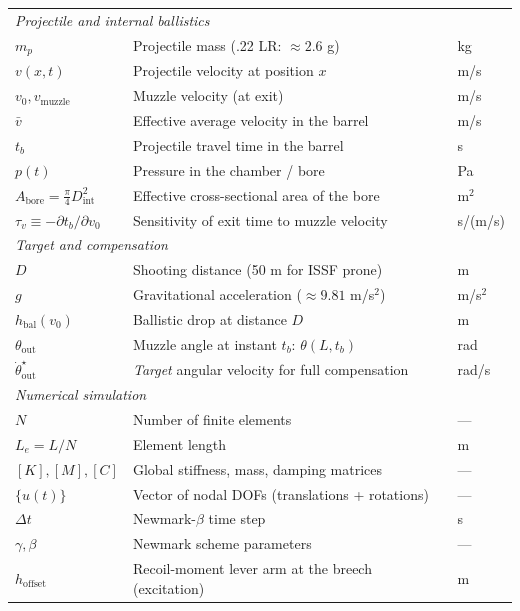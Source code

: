 \documentclass[12pt,a4paper]{article}
\begin{document}
\begin{center}
\begin{tabular}{l l l}
			\midrule
			\multicolumn{3}{l}{\emph{Projectile and internal ballistics}} \\
			$m_p$ & Projectile mass (.22 LR: $\approx 2.6$ g) & kg \\
			$v(x,t)$ & Projectile velocity at position $x$ & m/s \\
			$v_0, v_\text{muzzle}$ & Muzzle velocity (at exit) & m/s \\
			$\bar v$ & Effective average velocity in the barrel & m/s \\
			$t_b$ & Projectile travel time in the barrel & s \\
			$p(t)$ & Pressure in the chamber / bore & Pa \\
			$A_\text{bore} = \tfrac{\pi}{4} D_\text{int}^2$ & Effective cross-sectional area of the bore & m$^2$ \\
			$\tau_v \equiv -\partial t_b/\partial v_0$ & Sensitivity of exit time to muzzle velocity & s/(m/s) \\
			\midrule
			\multicolumn{3}{l}{\emph{Target and compensation}} \\
			$D$ & Shooting distance (50 m for ISSF prone) & m \\
			$g$ & Gravitational acceleration ($\approx 9.81$ m/s$^2$) & m/s$^2$ \\
			$h_\text{bal}(v_0)$ & Ballistic drop at distance $D$ & m \\
			$\theta_\text{out}$ & Muzzle angle at instant $t_b$: $\theta(L, t_b)$ & rad \\
			$\dot\theta_\text{out}^\star$ & \emph{Target} angular velocity for full compensation & rad/s \\
			\midrule
			\multicolumn{3}{l}{\emph{Numerical simulation}} \\
			$N$ & Number of finite elements & --- \\
			$L_e = L/N$ & Element length & m \\
			$[K], [M], [C]$ & Global stiffness, mass, damping matrices & --- \\
			$\{u(t)\}$ & Vector of nodal DOFs (translations + rotations) & --- \\
			$\Delta t$ & Newmark-$\beta$ time step & s \\
			$\gamma, \beta$ & Newmark scheme parameters & --- \\
			$h_\text{offset}$ & Recoil-moment lever arm at the breech (excitation) & m \\
			\bottomrule
		\end{tabular}
	\end{center}
\end{document}
